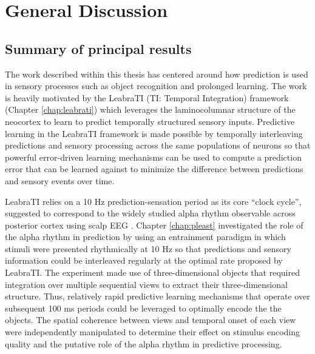 \documentclass[dwyatte_dissertation.tex]{subfiles}
\begin{document}
\sloppy

\chapter{General Discussion}
\section{Summary of principal results}
The work described within this thesis has centered around how prediction is used in sensory processes such as object recognition and prolonged learning. The work is heavily motivated by the LeabraTI (TI: Temporal Integration) framework (Chapter \ref{chap:leabrati}) which leverages the laminocolumnar structure of the neocortex \cite{Mountcastle97,BuxhoevedenCasanova02,HortonAdams05} to learn to predict temporally structured sensory inputs. Predictive learning in the LeabraTI framework is made possible by temporally interleaving predictions and sensory processing across the same populations of neurons so that powerful error-driven learning mechanisms \cite{OReillyMunakata00,OReillyMunakataFrankEtAl12} can be used to compute a prediction error that can be learned against to minimize the difference between predictions and sensory events over time.

LeabraTI relies on a 10 Hz prediction-sensation period as its core ``clock cycle'', suggested to correspond to the widely studied alpha rhythm observable across posterior cortex using scalp EEG \cite{PalvaPalva07,HanslmayrGrossKlimeschEtAl11,VanRullenBuschDrewesEtAl11}. Chapter \ref{chap:pleast} investigated the role of the alpha rhythm in prediction by using an entrainment paradigm \cite{SchroederLakatosKajikawaEtAl08,CalderoneLakatosButlerEtAlInPress} in which stimuli were presented rhythmically at 10 Hz so that predictions and sensory information could be interleaved regularly at the optimal rate proposed by LeabraTI. The experiment made use of three-dimensional objects that required integration over multiple sequential views to extract their three-dimensional structure. Thus, relatively rapid predictive learning mechanisms that operate over subsequent 100 ms periods could be leveraged to optimally encode the the objects. The spatial coherence between views and temporal onset of each view were independently manipulated to determine their effect on stimulus encoding quality and the putative role of the alpha rhythm in predictive processing.
\end{document}
